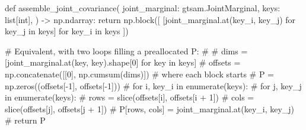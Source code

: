 \begin{pythoncode}
def assemble_joint_covariance(
    joint_marginal: gtsam.JointMarginal,
    keys: list[int],
) -> np.ndarray:
    return np.block([
        [joint_marginal.at(key_i, key_j) for key_j in keys]
        for key_i in keys
    ])

    # Equivalent, with two loops filling a preallocated P:
    #
    # dims = [joint_marginal.at(key, key).shape[0] for key in keys]
    # offsets = np.concatenate([[0], np.cumsum(dims)])  # where each block starts
    # P = np.zeros((offsets[-1], offsets[-1]))
    # for i, key_i in enumerate(keys):
    #     for j, key_j in enumerate(keys):
    #         rows = slice(offsets[i], offsets[i + 1])
    #         cols = slice(offsets[j], offsets[j + 1])
    #         P[rows, cols] = joint_marginal.at(key_i, key_j)
    # return P
\end{pythoncode}
